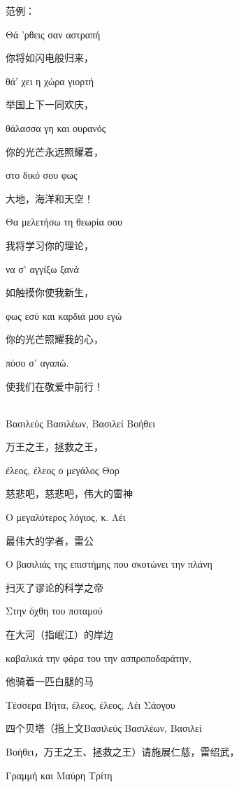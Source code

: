 \documentclass[UTF8,12pt,oneside]{ctexbook}
\begin{document}
    范例：
    
    \begin{center}
    \fangsong
    Θά 'ρθεις σαν αστραπή
    
    你将如闪电般归来，
    
    θά' χει η χώρα γιορτή
    
    举国上下一同欢庆，
    
    θάλασσα γη και ουρανός
    
    你的光芒永远照耀着，
    
    στο δικό σου φως
    
    大地，海洋和天空！
    
    Θα μελετήσω τη θεωρία σου
    
    我将学习你的理论，
    
    να σ' αγγίξω ξανά
    
    如触摸你使我新生，
    
    φως εσύ και καρδιά μου εγώ
    
    你的光芒照耀我的心，
    
    πόσο σ' αγαπώ.
    
    使我们在敬爱中前行！
    
    ~\\
    
    Βασιλεύς Βασιλέων, Βασιλεί Βοήθει
    
    万王之王，拯救之王，
    
    έλεος, έλεος ο μεγάλος Θορ
    
    慈悲吧，慈悲吧，伟大的雷神
    
    Ο μεγαλύτερος λόγιος, κ. Λέι
    
    最伟大的学者，雷公
    
    Ο βασιλιάς της επιστήμης που σκοτώνει την πλάνη
    
    扫灭了谬论的科学之帝
    
    Στην όχθη του ποταμού
    
    在大河（指岷江）的岸边
    
    καβαλικά την φάρα του την ασπροποδαράτην,
    
    他骑着一匹白腿的马
    
    Τέσσερα Βήτα, έλεος, έλεος, Λέι Σάογου
    
    四个贝塔（指上文Βασιλεύς Βασιλέων, Βασιλεί 
    
    Βοήθει，万王之王、拯救之王）请施展仁慈，雷绍武，
    
    Γραμμή και Μαύρη Τρίτη
    

\end{center}
\end{document}

